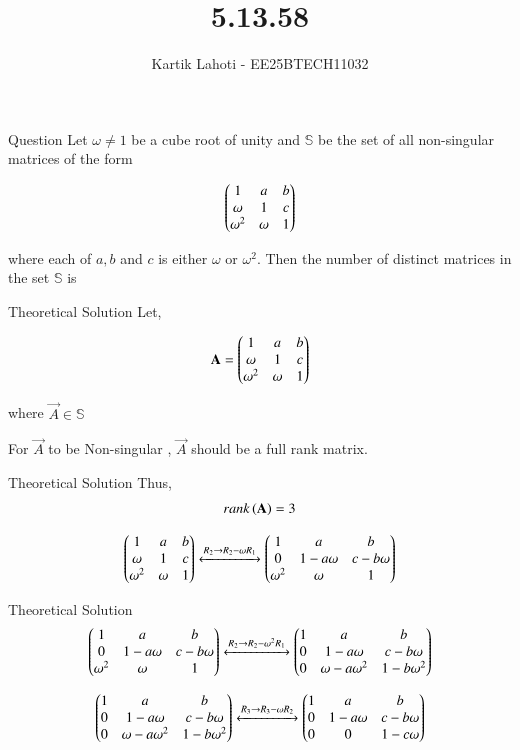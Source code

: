 \documentclass{beamer}
\title %
{5.13.58}
\author 
{Kartik Lahoti - EE25BTECH11032}
\begin{document}
\frame{\titlepage}
\begin{frame}{Question}
Let $\omega \neq 1$ be a cube root of unity and $\mathbb{S}$ be the set of all non-singular matrices of the form 

\begin{align}
    \begin{pmatrix}1 & a & b \\ \omega & 1 & c \\ \omega^2 & \omega & 1\end{pmatrix}
\end{align}

where each of $a,b$ and $c$ is either $\omega$ or $\omega^2$. Then the number of distinct matrices in the set $\mathbb{S}$ is
\end{frame}

\begin{frame}{Theoretical Solution}
Let,

\begin{align}
    \mathbf{A} = \begin{pmatrix}1 & a & b \\ \omega & 1 & c \\ \omega^2 & \omega & 1\end{pmatrix}
\end{align}

where $\vec{A} \in \mathbb{S}$

For $\vec{A}$ to be Non-singular , $\vec{A}$ should be a full rank matrix.
\end{frame}

\begin{frame}{Theoretical Solution}
Thus, 
\begin{align}
    rank\left(\mathbf{A}\right) = 3 
\end{align}


\begin{align}
    \begin{pmatrix}1 & a & b \\ \omega & 1 & c \\ \omega^2 & \omega & 1\end{pmatrix} \xleftrightarrow[]{R_2\rightarrow R_2 - \omega R_1 }\begin{pmatrix}1 & a & b \\ 0 & 1-a\omega & c-b\omega \\ \omega^2 & \omega & 1\end{pmatrix}
\end{align}
\end{frame}

\begin{frame}{Theoretical Solution}
\begin{align}
    \begin{pmatrix}1 & a & b \\ 0 & 1-a\omega & c-b\omega \\ \omega^2 & \omega & 1\end{pmatrix} \xleftrightarrow[]{R_2\rightarrow R_2 - \omega^2 R_1 }\begin{pmatrix}1 & a & b \\ 0 & 1-a\omega & c-b\omega \\ 0 & \omega - a\omega^2 & 1-b\omega^2\end{pmatrix}
\end{align}

\begin{align}
    \begin{pmatrix}1 & a & b \\ 0 & 1-a\omega & c-b\omega \\ 0 & \omega - a\omega^2 & 1-b\omega^2\end{pmatrix} \xleftrightarrow[]{R_3\rightarrow R_3 - \omega R_2 }\begin{pmatrix}1 & a & b \\ 0 & 1-a\omega & c-b\omega \\ 0 & 0 & 1-c\omega\end{pmatrix}
\end{align}
\end{frame}
\end{document}
